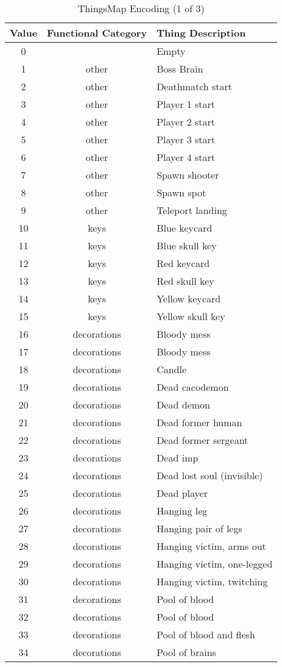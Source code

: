 \begin{table}[b]
	\centering
	\begin{tabularx}{\textwidth}{| c | c | X | }
		\hline
		\textbf{Value} & \textbf{Functional Category} & \textbf{Thing Description} \\
		\hline
		0	& 	& Empty \\
		1	& other	& Boss Brain \\
		2	& other	& Deathmatch start \\
		3	& other	& Player 1 start \\
		4	& other	& Player 2 start \\
		5	& other	& Player 3 start \\
		6	& other	& Player 4 start \\
		7	& other	& Spawn shooter \\
		8	& other	& Spawn spot \\
		9	& other	& Teleport landing \\
		10	& keys	& Blue keycard \\
		11	& keys	& Blue skull key \\
		12	& keys	& Red keycard \\
		13	& keys	& Red skull key \\
		14	& keys	& Yellow keycard \\
		15	& keys	& Yellow skull key \\
		16	& decorations	& Bloody mess \\
		17	& decorations	& Bloody mess \\
		18	& decorations	& Candle \\
		19	& decorations	& Dead cacodemon \\
		20	& decorations	& Dead demon \\
		21	& decorations	& Dead former human \\
		22	& decorations	& Dead former sergeant \\
		23	& decorations	& Dead imp \\
		24	& decorations	& Dead lost soul (invisible) \\
		25	& decorations	& Dead player \\
		26	& decorations	& Hanging leg \\
		27	& decorations	& Hanging pair of legs \\
		28	& decorations	& Hanging victim, arms out \\
		29	& decorations	& Hanging victim, one-legged \\
		30	& decorations	& Hanging victim, twitching \\
		31	& decorations	& Pool of blood \\
		32	& decorations	& Pool of blood \\
		33	& decorations	& Pool of blood and flesh \\
		34	& decorations	& Pool of brains \\
						\hline
			\end{tabularx}
		\caption{ThingsMap Encoding (1 of 3)}
		\label{tab:thingsmap1}
		\end{table}
		
